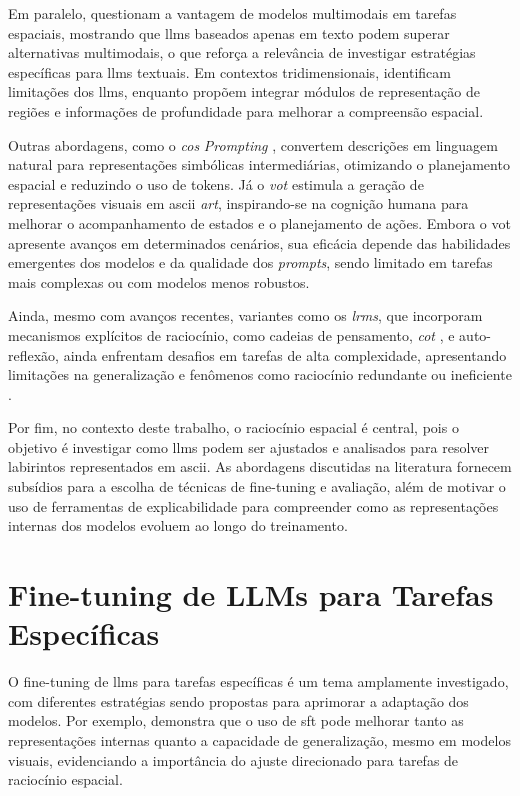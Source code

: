 Em paralelo, \cite{wang2024pictureworththousandwords} questionam a vantagem de modelos multimodais em tarefas espaciais, mostrando que \gls{llms} baseados apenas em texto podem superar alternativas multimodais, o que reforça a relevância de investigar estratégias específicas para \gls{llms} textuais. Em contextos tridimensionais, \cite{zhang2025doespointcloudboost} identificam limitações dos \gls{llms}, enquanto \cite{cheng2024spatialrgpt} propõem integrar módulos de representação de regiões e informações de profundidade para melhorar a compreensão espacial.

Outras abordagens, como o \textit{\gls{cos}} \textit{Prompting} \cite{hu2024chainofsymbol}, convertem descrições em linguagem natural para representações simbólicas intermediárias, otimizando o planejamento espacial e reduzindo o uso de tokens. Já o \textit{\gls{vot}} \cite{wu2024visualizationofthought} estimula a geração de representações visuais em \gls{ascii} \textit{art}, inspirando-se na cognição humana para melhorar o acompanhamento de estados e o planejamento de ações. Embora o \gls{vot} apresente avanços em determinados cenários, sua eficácia depende das habilidades emergentes dos modelos e da qualidade dos \textit{prompts}, sendo limitado em tarefas mais complexas ou com modelos menos robustos.

Ainda, mesmo com avanços recentes, variantes como os \textit{\gls{lrms}}, que incorporam mecanismos explícitos de raciocínio, como cadeias de pensamento, \textit{\gls{cot}} \cite{wei2023chainofthought}, e auto-reflexão, ainda enfrentam desafios em tarefas de alta complexidade, apresentando limitações na generalização e fenômenos como raciocínio redundante ou ineficiente \cite{shojaee2025illusionthinking}.

Por fim, no contexto deste trabalho, o raciocínio espacial é central, pois o objetivo é investigar como \gls{llms} podem ser ajustados e analisados para resolver labirintos representados em \gls{ascii}. As abordagens discutidas na literatura fornecem subsídios para a escolha de técnicas de fine-tuning e avaliação, além de motivar o uso de ferramentas de explicabilidade para compreender como as representações internas dos modelos evoluem ao longo do treinamento.

\section{Fine-tuning de LLMs para Tarefas Específicas}

O fine-tuning de \gls{llms} para tarefas específicas é um tema amplamente investigado, com diferentes estratégias sendo propostas para aprimorar a adaptação dos modelos. Por exemplo, \cite{jiang2024supervised} demonstra que o uso de \gls{sft} pode melhorar tanto as representações internas quanto a capacidade de generalização, mesmo em modelos visuais, evidenciando a importância do ajuste direcionado para tarefas de raciocínio espacial.

